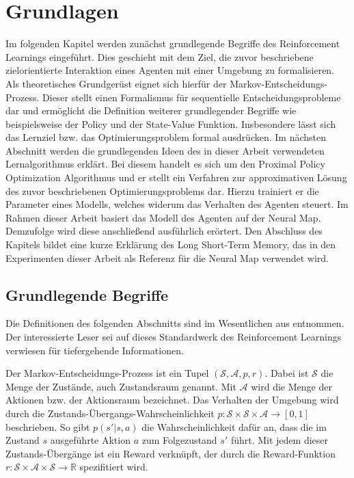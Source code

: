 \chapter{Grundlagen}

Im folgenden Kapitel werden zunächst grundlegende Begriffe des Reinforcement Learnings eingeführt. Dies geschieht mit dem Ziel, die zuvor beschriebene zielorientierte Interaktion eines Agenten mit einer Umgebung zu formalisieren. Als theoretisches Grundgerüst eignet sich hierfür der Markov-Entscheidungs-Prozess. Dieser stellt einen Formalismus für sequentielle Entscheidungsprobleme dar und ermöglicht die Definition weiterer grundlegender Begriffe wie beispielsweise der Policy und der State-Value Funktion. Insbesondere lässt sich das Lernziel bzw. das Optimierungsproblem formal ausdrücken. Im nächsten Abschnitt werden die grundlegenden Ideen des in dieser Arbeit verwendeten Lernalgorithmus erklärt. Bei diesem handelt es sich um den Proximal Policy Optimization Algorithmus und er stellt ein Verfahren zur approximativen Lösung des zuvor beschriebenen Optimierungsproblems dar. Hierzu trainiert er die Parameter eines Modells, welches widerum das Verhalten des Agenten steuert. Im Rahmen dieser Arbeit basiert das Modell des Agenten auf der Neural Map. Demzufolge wird diese anschließend ausführlich erörtert. Den Abschluss des Kapitels bildet eine kurze Erklärung des Long Short-Term Memory, das in den Experimenten dieser Arbeit als Referenz für die Neural Map verwendet wird.


\section{Grundlegende Begriffe}
\label{sec_basics}

Die Definitionen des folgenden Abschnitts sind im Wesentlichen aus \cite{SuttonBarto} entnommen. Der interessierte Leser sei auf dieses Standardwerk des Reinforcement Learnings verwiesen für tiefergehende Informationen.

Der Markov-Entscheidungs-Prozess ist ein Tupel $(\mathcal{S, A}, p, r)$. Dabei ist $\mathcal{S}$ die Menge der Zustände, auch Zustandsraum genannt. Mit $\mathcal{A}$ wird die Menge der Aktionen bzw. der Aktionsraum bezeichnet. Das Verhalten der Umgebung wird durch die Zustands-Übergangs-Wahrscheinlichkeit $p: \mathcal{S} \times \mathcal{S} \times \mathcal{A} \to [0,1]$ beschrieben. So gibt $p(s'|s,a)$ die Wahrscheinlichkeit dafür an, dass die im Zustand $s$ ausgeführte Aktion $a$  zum Folgezustand $s'$ führt. Mit jedem dieser Zustands-Übergänge ist ein Reward verknüpft, der durch die Reward-Funktion $r: \mathcal{S} \times \mathcal{A} \times \mathcal{S} \to \mathbb{R}$ spezifitiert wird. \\

